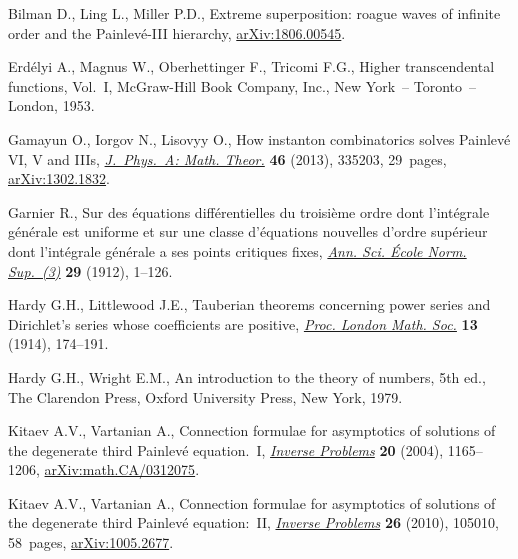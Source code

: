\documentclass[pdftex]{sigma}
\numberwithin{equation}{section}
\begin{document}
\begin{thebibliography}{99}
\footnotesize\itemsep=0pt

Bilman D., Ling L., Miller P.D., Extreme superposition: roague waves of
 infinite order and the {P}ainlev\'e-III hierarchy, \href{https://arxiv.org/abs/1806.00545}{arXiv:1806.00545}.

Erd\'{e}lyi A., Magnus W., Oberhettinger F., Tricomi F.G., Higher
 transcendental functions, {V}ol.~{I}, McGraw-Hill Book Company, Inc., New
 York~-- Toronto~-- London, 1953.

Gamayun O., Iorgov N., Lisovyy O., How instanton combinatorics solves
 {P}ainlev\'{e} {VI}, {V} and {III}s, \href{https://doi.org/10.1088/1751-8113/46/33/335203}{\textit{J.~Phys.~A: Math. Theor.}}
 \textbf{46} (2013), 335203, 29~pages, \href{https://arxiv.org/abs/1302.1832}{arXiv:1302.1832}.

Garnier R., Sur des \'{e}quations diff\'{e}rentielles du troisi\`eme ordre dont
 l'int\'{e}grale g\'{e}n\'{e}rale est uniforme et sur une classe
 d'\'{e}quations nouvelles d'ordre sup\'{e}rieur dont l'int\'{e}grale
 g\'{e}n\'{e}rale a ses points critiques fixes, \href{https://doi.org/10.24033/asens.644}{\textit{Ann. Sci. \'{E}cole
 Norm. Sup.~(3)}} \textbf{29} (1912), 1--126.

Hardy G.H., Littlewood J.E., Tauberian theorems concerning power series and
 {D}irichlet's series whose coefficients are positive, \href{https://doi.org/10.1112/plms/s2-13.1.174}{\textit{Proc. London
 Math. Soc.}} \textbf{13} (1914), 174--191.

Hardy G.H., Wright E.M., An introduction to the theory of numbers, 5th ed., The
 Clarendon Press, Oxford University Press, New York, 1979.

Kitaev A.V., Vartanian A., Connection formulae for asymptotics of solutions of
 the degenerate third {P}ainlev\'{e} equation.~{I}, \href{https://doi.org/10.1088/0266-5611/20/4/010}{\textit{Inverse Problems}}
 \textbf{20} (2004), 1165--1206, \href{https://arxiv.org/abs/math.CA/0312075}{arXiv:math.CA/0312075}.

Kitaev A.V., Vartanian A., Connection formulae for asymptotics of solutions of
 the degenerate third {P}ainlev\'{e} equation:~{II}, \href{https://doi.org/10.1088/0266-5611/26/10/105010}{\textit{Inverse Problems}}
 \textbf{26} (2010), 105010, 58~pages, \href{https://arxiv.org/abs/1005.2677}{arXiv:1005.2677}.


\end{thebibliography}
\end{document}
